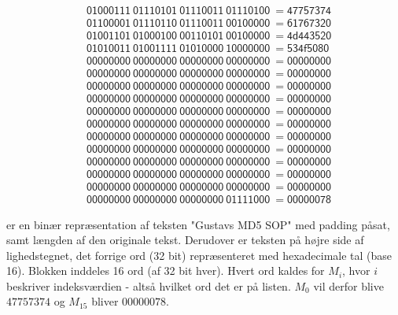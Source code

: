 \documentclass[12pt]{article}
\begin{document}
\begin{equation}
\begin{split}
&\mathsf{01000111 \ 01110101 \ 01110011 \ 01110100 \ = 47757374 }\\
&\mathsf{01100001 \ 01110110 \ 01110011 \ 00100000 \ = 61767320 }\\
&\mathsf{01001101 \ 01000100 \ 00110101 \ 00100000 \ = 4d443520 }\\
&\mathsf{01010011 \ 01001111 \ 01010000 \ 10000000 \ = 534f5080 }\\
&\mathsf{00000000 \ 00000000 \ 00000000 \ 00000000 \ = 00000000 }\\
&\mathsf{00000000 \ 00000000 \ 00000000 \ 00000000 \ = 00000000 }\\
&\mathsf{00000000 \ 00000000 \ 00000000 \ 00000000 \ = 00000000 }\\
&\mathsf{00000000 \ 00000000 \ 00000000 \ 00000000 \ = 00000000 }\\
&\mathsf{00000000 \ 00000000 \ 00000000 \ 00000000 \ = 00000000 }\\
&\mathsf{00000000 \ 00000000 \ 00000000 \ 00000000 \ = 00000000 }\\
&\mathsf{00000000 \ 00000000 \ 00000000 \ 00000000 \ = 00000000 }\\
&\mathsf{00000000 \ 00000000 \ 00000000 \ 00000000 \ = 00000000 }\\
&\mathsf{00000000 \ 00000000 \ 00000000 \ 00000000 \ = 00000000 }\\
&\mathsf{00000000 \ 00000000 \ 00000000 \ 00000000 \ = 00000000 }\\
&\mathsf{00000000 \ 00000000 \ 00000000 \ 00000000 \ = 00000000 }\\
&\mathsf{00000000 \ 00000000 \ 00000000 \ 01111000 \ = 00000078 }
\end{split}
\label{step-2-binary}
\end{equation}

\equationautorefname{~\ref{step-2-binary}} er en binær repræsentation af teksten "Gustavs MD5 SOP" med padding påsat, samt længden af den originale tekst. Derudover er teksten på højre side af lighedstegnet, det forrige ord (32 bit) repræsenteret med hexadecimale tal (base 16). Blokken inddeles 16 ord (af 32 bit hver). Hvert ord kaldes for $M_i$, hvor $i$ beskriver indeksværdien - altså hvilket ord det er på listen. $M_0$ vil derfor blive $47757374$ og $M_{15}$ bliver $00000078$. \footnotemark[4]

\end{document}
